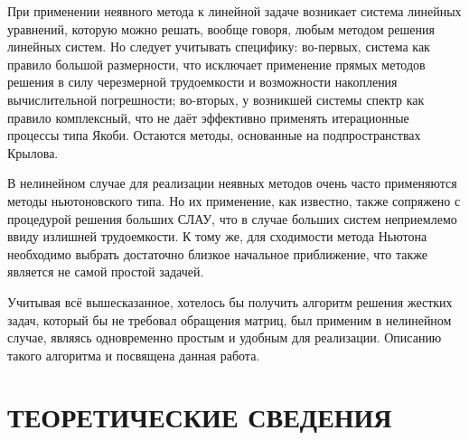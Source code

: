 \documentclass[a4paper, 14pt]{extreport} %
\begin{document}

При применении неявного метода к линейной задаче возникает система
линейных уравнений, которую можно решать,  вообще говоря, любым
методом решения линейных систем. Но следует учитывать специфику:
во-первых, система как правило большой размерности, что исключает
применение прямых методов решения в силу черезмерной трудоемкости и
возможности накопления вычислительной погрешности; во-вторых, у
возникшей системы спектр как правило комплексный, что не даёт
эффективно применять итерационные процессы типа Якоби. Остаются
методы, основанные на подпространствах Крылова.

В нелинейном случае для реализации неявных методов очень часто
применяются методы ньютоновского типа. Но их применение, как
известно, также сопряжено с процедурой решения больших СЛАУ, что в
случае больших систем неприемлемо ввиду излишней трудоемкости. К
тому же, для сходимости метода Ньютона необходимо выбрать достаточно
близкое начальное приближение, что также является не самой простой
задачей.

Учитывая всё вышесказанное, хотелось бы получить алгоритм решения
жестких задач, который бы не требовал обращения матриц, был применим
в нелинейном случае, являясь одновременно простым и удобным для
реализации. Описанию такого алгоритма и посвящена данная работа.




\chapter{ТЕОРЕТИЧЕСКИЕ СВЕДЕНИЯ}


\end{document}
